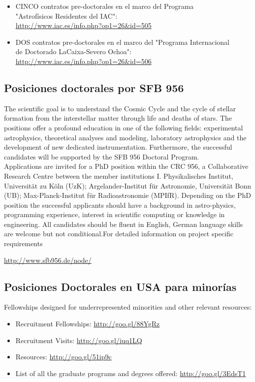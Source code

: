 \documentclass{book}
\begin{document}
\begin{itemize}
\item CINCO contratos pre-doctorales en el marco del Programa\\
    "Astrofísicos Residentes del IAC":\\
\url{http://www.iac.es/info.php?op1=26&id=505}
\item DOS contratos pre-doctorales en el marco del "Programa Internacional\\
    de Doctorado LaCaixa-Severo Ochoa":\\
\url{http://www.iac.es/info.php?op1=26&id=506}
\end{itemize} 
\subsection{Posiciones doctorales por SFB 956}
The scientific goal is to understand the Cosmic Cycle and the cycle of stellar formation from the interstellar matter through life and deaths of stars. The positions offer a profound education in one of the following fields: experimental astrophysics, theoretical analyses and modeling, laboratory astrophysics and the development of new dedicated instrumentation. Furthermore, the successful candidates will be supported by the SFB 956 Doctoral Program.\\

Applications are invited for a PhD position within the CRC 956, a Collaborative Research Centre between the member institutions I. Physikalisches Institut, Universität zu Köln (UzK); Argelander-Institut für Astronomie, Universität Bonn (UB); Max-Planck-Institut für Radioastronomie (MPIfR). Depending on the PhD position the successful applicants should have a background in astro-physics, programming experience, interest in scientific computing or knowledge in engineering. All candidates should be fluent in English, German language skills are welcome but not conditional.For detailed information on project specific requirements 
\begin{center}
\url{http://www.sfb956.de/node/}
\end{center}

\newpage
\subsection{Posiciones Doctorales en USA para minorías}

Fellowships designed for underrepresented minorities and other relevant resources:
\begin{itemize}
\item Recruitment Fellowships: \url{http://goo.gl/88YgRz}
\item Recruitment Visits: \url{http://goo.gl/iuq1LQ}
\item Resources: \url{http://goo.gl/51ip9c}
\item List of all the graduate programs and degrees offered: \url{http://goo.gl/3EdsT1}
\end{itemize}
\end{document}
